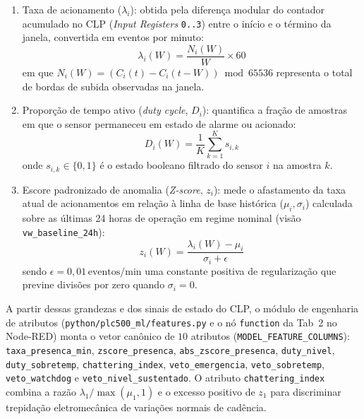 \begin{enumerate}
  \item Taxa de acionamento ($\lambda_i$): obtida pela diferença modular do contador acumulado no CLP (\textit{Input Registers} \texttt{0..3}) entre o início e o término da janela, convertida em eventos por minuto:
  \begin{equation}
    \label{eq:taxa_acionamento}
    \lambda_i(W) = \frac{N_i(W)}{W} \times 60
  \end{equation}
  em que $N_i(W) = \left(C_i(t) - C_i(t - W)\right) \bmod 65536$ representa o total de bordas de subida observadas na janela.

  \item Proporção de tempo ativo (\textit{duty cycle}, $D_i$): quantifica a fração de amostras em que o sensor permaneceu em estado de alarme ou acionado:
  \begin{equation}
    \label{eq:duty_cycle}
    D_i(W) = \frac{1}{K} \sum_{k=1}^{K} s_{i,k}
  \end{equation}
  onde $s_{i,k} \in \{0, 1\}$ é o estado booleano filtrado do sensor $i$ na amostra $k$.

  \item Escore padronizado de anomalia (\textit{Z-score}, $z_i$): mede o afastamento da taxa atual de acionamentos em relação à linha de base histórica ($\mu_i, \sigma_i$) calculada sobre as últimas 24 horas de operação em regime nominal (visão \texttt{vw\_baseline\_24h}):
  \begin{equation}
    \label{eq:zscore}
    z_i(W) = \frac{\lambda_i(W) - \mu_i}{\sigma_i + \epsilon}
  \end{equation}
  sendo $\epsilon = 0{,}01\,\text{eventos/min}$ uma constante positiva de regularização que previne divisões por zero quando $\sigma_i = 0$.
\end{enumerate}

A partir dessas grandezas e dos sinais de estado do CLP, o módulo de engenharia de atributos (\texttt{python/\allowbreak plc500\_\allowbreak ml/\allowbreak features.py} e o nó \texttt{function} da Tab~2 no Node-RED) monta o vetor canônico de $10$ atributos (\texttt{MODEL\_\allowbreak FEATURE\_\allowbreak COLUMNS}): \texttt{taxa\_\allowbreak presenca\_\allowbreak min}, \texttt{zscore\_\allowbreak presenca}, \texttt{abs\_\allowbreak zscore\_\allowbreak presenca}, \texttt{duty\_\allowbreak nivel}, \texttt{duty\_\allowbreak sobretemp}, \texttt{chattering\_\allowbreak index}, \texttt{veto\_\allowbreak emergencia}, \texttt{veto\_\allowbreak sobretemp}, \texttt{veto\_\allowbreak watchdog} e \texttt{veto\_\allowbreak nivel\_\allowbreak sustentado}. O atributo \texttt{chattering\_\allowbreak index} combina a razão $\lambda_1 / \max(\mu_1, 1)$ e o excesso positivo de $z_1$ para discriminar trepidação eletromecânica de variações normais de cadência.

